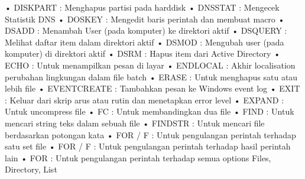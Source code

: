 \documentclass{article}
\begin{document}
• DISKPART : Menghapus partisi pada harddisk  
• DNSSTAT : Mengecek Statistik DNS  
• DOSKEY : Mengedit baris perintah dan membuat macro  
• DSADD : Menambah User (pada komputer) ke direktori aktif  
• DSQUERY : Melihat daftar item dalam direktori aktif  
• DSMOD : Mengubah user (pada komputer) di direktori aktif   
• DSRM : Hapus item dari Active Directory  
• ECHO : Untuk menampilkan pesan di layar  
• ENDLOCAL : Akhir localisation  perubahan lingkungan dalam file batch  
• ERASE : Untuk menghapus satu atau lebih file  
• EVENTCREATE : Tambahkan pesan ke Windows event log  
• EXIT : Keluar dari skrip arus atau rutin dan menetapkan error level  
• EXPAND : Untuk uncompress file  
•	FC : Untuk membandingkan dua file 
•	FIND : Untuk mencari string teks dalam sebuah file 
•	FINDSTR : Untuk mencari file berdasarkan potongan kata
•	FOR / F : Untuk pengulangan perintah terhadap satu set file 
•	FOR / F : Untuk pengulangan perintah terhadap hasil perintah lain 
•	FOR : Untuk pengulangan perintah terhadap semua options Files, Directory, List 
\end{document}
